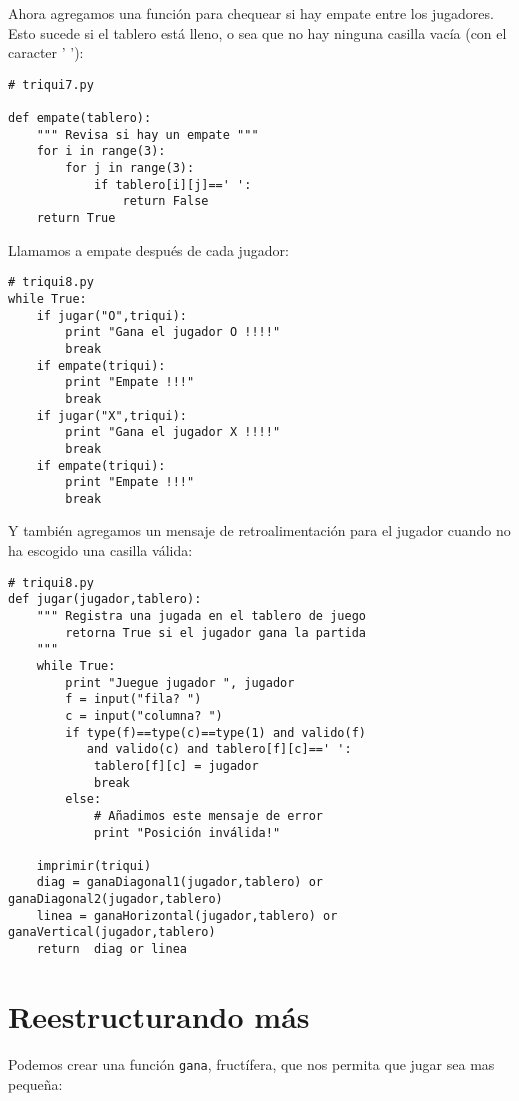 Ahora agregamos una función para chequear si hay empate entre los jugadores.
Esto sucede si el tablero está lleno, o sea que no hay ninguna casilla vacía 
(con el caracter ' '):

\beforeverb
\begin{verbatim}
# triqui7.py

def empate(tablero):
    """ Revisa si hay un empate """
    for i in range(3):
        for j in range(3):
            if tablero[i][j]==' ':
                return False
    return True

\end{verbatim}
\afterverb

Llamamos a empate después de cada jugador:
\beforeverb
\begin{verbatim}
# triqui8.py
while True:
    if jugar("O",triqui):
        print "Gana el jugador O !!!!"
        break
    if empate(triqui):
        print "Empate !!!"
        break
    if jugar("X",triqui):
        print "Gana el jugador X !!!!"
        break
    if empate(triqui):
        print "Empate !!!"
        break
\end{verbatim}
\afterverb

Y también agregamos un mensaje de retroalimentación para el jugador cuando no 
ha escogido una casilla válida:

\beforeverb
\begin{verbatim}
# triqui8.py
def jugar(jugador,tablero):
    """ Registra una jugada en el tablero de juego
        retorna True si el jugador gana la partida
    """
    while True:     
        print "Juegue jugador ", jugador
        f = input("fila? ")
        c = input("columna? ")
        if type(f)==type(c)==type(1) and valido(f) 
           and valido(c) and tablero[f][c]==' ':
            tablero[f][c] = jugador
            break
        else:
            # Añadimos este mensaje de error
            print "Posición inválida!"

    imprimir(triqui)
    diag = ganaDiagonal1(jugador,tablero) or ganaDiagonal2(jugador,tablero)
    linea = ganaHorizontal(jugador,tablero) or ganaVertical(jugador,tablero)
    return  diag or linea
\end{verbatim}
\afterverb

\section{Reestructurando más}

Podemos crear una función \texttt{gana}, fructífera, que nos permita que jugar sea
mas pequeña:

